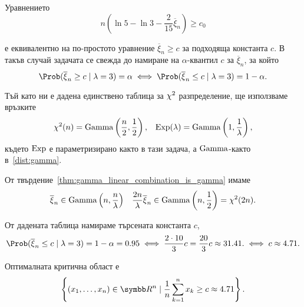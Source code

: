 \documentclass[numbers=endperiod, bibliography=totocnumbered]{scrartcl}
\begin{document}
\begin{solution}
\begin{enumerate}[label=\alph*)]
    Уравнението
    \begin{equation*}
      n \left(\ln 5 - \ln 3 - \frac 2 {15} \overline \xi_n \right) \geq c_0
    \end{equation*}

    е еквивалентно на по-простото уравнение \( \overline \xi_n \geq c \) за подходяща константа \( c \). В такъв случай задачата се свежда до намиране на \( \alpha \)-квантил \( c \) за \( \overline \xi_n \), за който
    \begin{equation*}
      \Prob(\overline \xi_n \geq c \mid \lambda = 3) = \alpha
      \iff
      \Prob(\overline \xi_n \leq c \mid \lambda = 3) = 1 - \alpha.
    \end{equation*}

    Тъй като ни е дадена единствено таблица за \( \chi^2 \) разпределение, ще използваме връзките
    \begin{align*}
      \chi^2(n) = \operatorname{Gamma} \left(\frac n 2, \frac 1 2 \right),
      &&
      \operatorname{Exp}(\lambda) = \operatorname{Gamma}\left(1, \frac 1 \lambda \right),
    \end{align*}
    където \( \operatorname{Exp} \) е параметризирано както в тази задача, а \( \operatorname{Gamma} \)-както в~\ref{dist:gamma}.

    От твърдение~\ref{thm:gamma_linear_combination_is_gamma} имаме
    \begin{align*}
      \overline \xi_n \in \operatorname{Gamma}\left( n, \frac n \lambda \right)
      &&
      \frac {2n} \lambda \overline \xi_n \in \operatorname{Gamma}\left( n, \frac 1 2 \right) = \chi^2(2n).
    \end{align*}

    От дадената таблица намираме търсената константа \( c \),
    \begin{equation*}
      \Prob(\overline \xi_n \leq c \mid \lambda = 3) = 1 - \alpha = 0.95
      \iff
      \frac {2 \cdot 10} 3 c = \frac {20} 3 c \approx 31.41.
      \iff
      c \approx 4.71.
    \end{equation*}

    Оптималната критична област е
    \begin{equation*}
      \left \{ (x_1, \ldots, x_n) \in \R^n \mid \frac 1 n \sum_{k=1}^n x_k \geq c \approx 4.71 \right \}.
    \end{equation*}
  \end{enumerate}
\end{solution}
\end{document}
